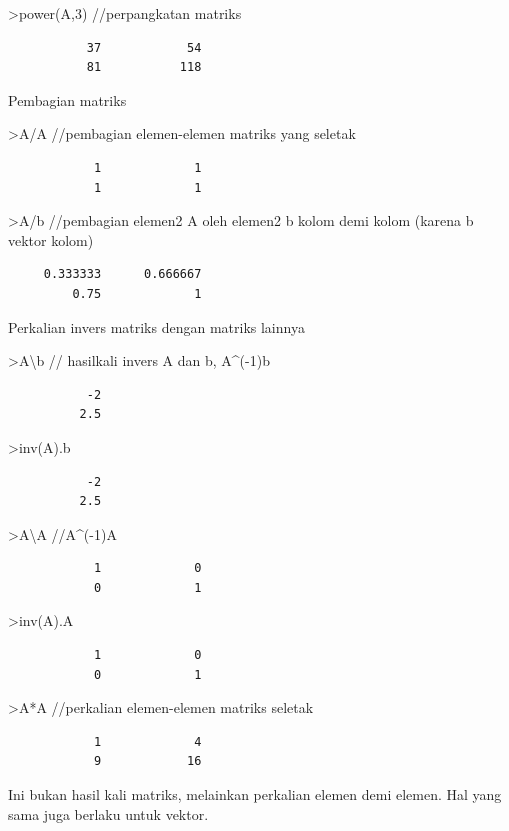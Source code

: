 \documentclass[
]{book}
\begin{document}
\textgreater power(A,3) //perpangkatan matriks

\begin{verbatim}
           37            54 
           81           118 
\end{verbatim}

Pembagian matriks

\textgreater A/A //pembagian elemen-elemen matriks yang seletak

\begin{verbatim}
            1             1 
            1             1 
\end{verbatim}

\textgreater A/b //pembagian elemen2 A oleh elemen2 b kolom demi kolom (karena b vektor kolom)

\begin{verbatim}
     0.333333      0.666667 
         0.75             1 
\end{verbatim}

Perkalian invers matriks dengan matriks lainnya

\textgreater A\textbackslash b // hasilkali invers A dan b, A\^{}(-1)b

\begin{verbatim}
           -2 
          2.5 
\end{verbatim}

\textgreater inv(A).b

\begin{verbatim}
           -2 
          2.5 
\end{verbatim}

\textgreater A\textbackslash A //A\^{}(-1)A

\begin{verbatim}
            1             0 
            0             1 
\end{verbatim}

\textgreater inv(A).A

\begin{verbatim}
            1             0 
            0             1 
\end{verbatim}

\textgreater A*A //perkalian elemen-elemen matriks seletak

\begin{verbatim}
            1             4 
            9            16 
\end{verbatim}

Ini bukan hasil kali matriks, melainkan perkalian elemen demi elemen. Hal yang sama juga berlaku untuk vektor.
\end{document}
